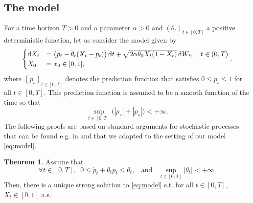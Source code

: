 \documentclass[11pt]{article}
\theoremstyle{definition}
\newtheorem{Thm}[Def]{Theorem}
\begin{document}
\subsection{The model}
For a time horizon $T>0$ and  a parameter $\alpha > 0$ and $(\theta_t)_{t\in[0,T]}$ a positive deterministic  function,  let us consider the model  given by
\begin{equation}
\begin{cases}
\dif X_t &= \big(\dot p_t - \theta_t (X_t-p_t)  \big)\dif t  +\sqrt{2 \alpha \theta_0 X_t (1-X_t)} \dif W_t, \quad t\in(0,T) \\
X_0&= x_0\in [0,1],
\end{cases}.  \label{eq:model}
\end{equation}
where $(p_t)_{t\in[0,T]}$ denotes the prediction function that satisfies $0\le p_t\le 1$ for all $t\in[0,T]$. This prediction function is assumed to be a smooth function of the time so that 
$$\sup_{t\in[0,T]}\bigl( |p_s| + |\dot p_s|\big) <+\infty .$$
The following proofs are based on standard arguments for stochastic processes that can be found e.g. in \cite{Alf} and \cite{KarShr} that we adapted to the setting of our model \eqref{eq:model}.
\begin{Thm}\label{thm:exun}
Assume that    
\begin{equation}\label{Assumption:1}
\forall  t\in[0,T],\;\; 0\le \dot p_t +\theta_tp_t\le \theta_t, \;\;\mbox{ and }\;\;
\sup_{t\in[0,T]}|\theta_t|<+\infty\tag{A}. 
\end{equation}
Then, there is a unique strong solution to \eqref{eq:model} s.t.  for all $t\in[0,T]$, $X_t\in[0,1]$ a.s.
\end{Thm}
\end{document}
